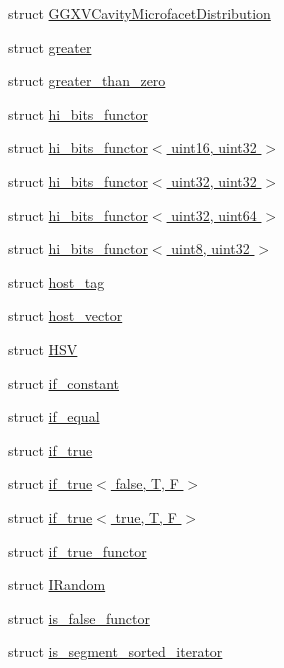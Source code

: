 \begin{DoxyCompactItemize}
struct \hyperlink{structcugar_1_1_g_g_x_v_cavity_microfacet_distribution}{G\+G\+X\+V\+Cavity\+Microfacet\+Distribution}
\item 
struct \hyperlink{structcugar_1_1greater}{greater}
\item 
struct \hyperlink{structcugar_1_1greater__than__zero}{greater\+\_\+than\+\_\+zero}
\item 
struct \hyperlink{structcugar_1_1hi__bits__functor}{hi\+\_\+bits\+\_\+functor}
\item 
struct \hyperlink{structcugar_1_1hi__bits__functor_3_01uint16_00_01uint32_01_4}{hi\+\_\+bits\+\_\+functor$<$ uint16, uint32 $>$}
\item 
struct \hyperlink{structcugar_1_1hi__bits__functor_3_01uint32_00_01uint32_01_4}{hi\+\_\+bits\+\_\+functor$<$ uint32, uint32 $>$}
\item 
struct \hyperlink{structcugar_1_1hi__bits__functor_3_01uint32_00_01uint64_01_4}{hi\+\_\+bits\+\_\+functor$<$ uint32, uint64 $>$}
\item 
struct \hyperlink{structcugar_1_1hi__bits__functor_3_01uint8_00_01uint32_01_4}{hi\+\_\+bits\+\_\+functor$<$ uint8, uint32 $>$}
\item 
struct \hyperlink{structcugar_1_1host__tag}{host\+\_\+tag}
\item 
struct \hyperlink{structcugar_1_1host__vector}{host\+\_\+vector}
\item 
struct \hyperlink{structcugar_1_1_h_s_v}{H\+SV}
\item 
struct \hyperlink{structcugar_1_1if__constant}{if\+\_\+constant}
\item 
struct \hyperlink{structcugar_1_1if__equal}{if\+\_\+equal}
\item 
struct \hyperlink{structcugar_1_1if__true}{if\+\_\+true}
\item 
struct \hyperlink{structcugar_1_1if__true_3_01false_00_01_t_00_01_f_01_4}{if\+\_\+true$<$ false, T, F $>$}
\item 
struct \hyperlink{structcugar_1_1if__true_3_01true_00_01_t_00_01_f_01_4}{if\+\_\+true$<$ true, T, F $>$}
\item 
struct \hyperlink{structcugar_1_1if__true__functor}{if\+\_\+true\+\_\+functor}
\item 
struct \hyperlink{structcugar_1_1_i_random}{I\+Random}
\item 
struct \hyperlink{structcugar_1_1is__false__functor}{is\+\_\+false\+\_\+functor}
\item 
struct \hyperlink{structcugar_1_1is__segment__sorted__iterator}{is\+\_\+segment\+\_\+sorted\+\_\+iterator}

\end{DoxyCompactItemize}
